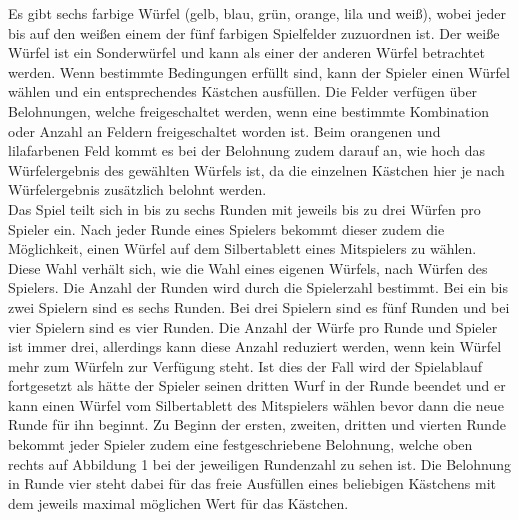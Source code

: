 Es gibt sechs farbige Würfel (gelb, blau, grün, orange, lila und weiß), wobei jeder bis auf den weißen einem der fünf farbigen Spielfelder zuzuordnen ist. Der weiße Würfel ist ein Sonderwürfel und kann als einer der anderen Würfel betrachtet werden. Wenn bestimmte Bedingungen erfüllt sind, kann der Spieler einen Würfel wählen und ein entsprechendes Kästchen ausfüllen. Die Felder verfügen über Belohnungen, welche freigeschaltet werden, wenn eine bestimmte Kombination oder Anzahl an Feldern freigeschaltet worden ist. Beim orangenen und lilafarbenen Feld kommt es bei der Belohnung zudem darauf an, wie hoch das Würfelergebnis des gewählten Würfels ist, da die einzelnen Kästchen hier je nach Würfelergebnis zusätzlich belohnt werden.
\\
Das Spiel teilt sich in bis zu sechs Runden mit jeweils bis zu drei Würfen pro Spieler ein. Nach jeder Runde eines Spielers bekommt dieser zudem die Möglichkeit, einen Würfel auf dem Silbertablett eines Mitspielers zu wählen. Diese Wahl verhält sich, wie die Wahl eines eigenen Würfels, nach Würfen des Spielers. Die Anzahl der Runden wird durch die Spielerzahl bestimmt. Bei ein bis zwei Spielern sind es sechs Runden. Bei drei Spielern sind es fünf Runden und bei vier Spielern sind es vier Runden. Die Anzahl der Würfe pro Runde und Spieler ist immer drei, allerdings kann diese Anzahl reduziert werden, wenn kein Würfel mehr zum Würfeln zur Verfügung steht. Ist dies der Fall wird der Spielablauf fortgesetzt als hätte der Spieler seinen dritten Wurf in der Runde beendet und er kann einen Würfel vom Silbertablett des Mitspielers wählen bevor dann die neue Runde für ihn beginnt. Zu Beginn der ersten, zweiten, dritten und vierten Runde bekommt jeder Spieler zudem eine festgeschriebene Belohnung, welche oben rechts auf Abbildung 1 bei der jeweiligen Rundenzahl zu sehen ist. Die Belohnung in Runde vier steht dabei für das freie Ausfüllen eines beliebigen Kästchens mit dem jeweils maximal möglichen Wert für das Kästchen.

